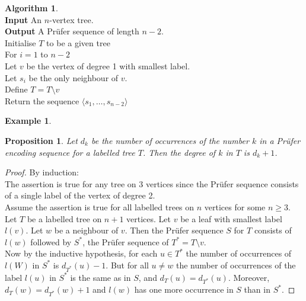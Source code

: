 \documentclass{article}
\newtheorem*{prop}{Proposition}
\theoremstyle{definition}
\newtheorem*{ex}{Example}
\newtheorem*{alg}{Algorithm}
\begin{document}
\begin{alg}~\\
\textbf{Input} An $n$-vertex tree.\\
\textbf{Output} A Pr\"ufer sequence of length $n-2$.\\
Initialise $T$ to be a given tree \\
For $i=1$ to $n-2$ \\
\indent Let $v$ be the vertex of degree 1 with smallest label.\\
\indent Let $s_i$ be the only neighbour of $v$.\\
\indent Define $T = T\setminus v$\\
Return the sequence $\langle s_1,\ldots,s_{n-2}\rangle$
\end{alg}

\begin{ex}
\end{ex}

\begin{prop}
Let $d_k$ be the number of occurrences of the number $k$ in a Pr\"ufer encoding sequence for a labelled tree $T$.
Then the degree of $k$ in $T$ is $d_k+1$.
\end{prop}

\begin{proof}
By induction: \\
The assertion is true for any tree on 3 vertices since the Pr\"ufer sequence consists of a single label of the vertex of degree 2. \\
Assume the assertion is true for all labelled trees on $n$ vertices for some $n\ge 3$.\\
Let $T$ be a labelled tree on $n+1$ vertices.
Let $v$ be a leaf with smallest label $l(v)$.
Let $w$ be a neighbour of $v$.
Then the Pr\"ufer sequence $S$ for $T$ consists of $l(w)$ followed by $S^*$, the Pr\"ufer sequence of $T^* = T\setminus v$. \\
Now by the inductive hypothesis, for each $u\in T^*$ the number of occurrences of $l(W)$ in $S^*$ is $d_{T^*}(u)-1$.
But for all $u\ne w$ the number of occurrences of the label $l(u)$ in $S^*$ is the same as in $S$, and $d_T(u)=d_{T^*}(u)$.
Moreover, $d_T(w) = d_{T^*}(w) + 1$ and $l(w)$ has one more occurrence in $S$ than in $S^*$.
\end{proof}
\end{document}
